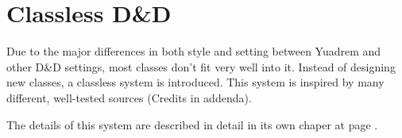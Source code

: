 \section{Classless D\&D} \label{sec::classlessdnd}

Due to the major differences in both style and setting between Yuadrem and other D\&D settings, most classes don't fit very well into it.
Instead of designing new classes, a classless system is introduced.
This system is inspired by many different, well-tested sources (Credits in addenda).

The details of this system are described in detail in its own chaper at page \pageref{ch::classlessdnd}.
